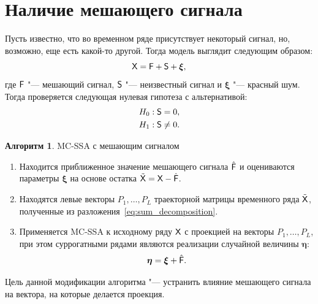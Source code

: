\documentclass[specialist,
substylefile = spbu_report.rtx,
subf,href,colorlinks=true, 12pt]{disser}
\theoremstyle{definition}
\newtheorem{algorithm}{Алгоритм}
\newcommand{\bfxi}{\boldsymbol{\xi}}
\begin{document}
\section{Наличие мешающего сигнала}\label{sect:nuisance}
Пусть известно, что во временном ряде присутствует некоторый сигнал, но, возможно, еще есть какой-то другой. Тогда модель выглядит следующим образом:
\[
\tX=\tF + \tS + \bfxi,
\]
где $\mathsf{F}$ "--- мешающий сигнал, $\mathsf{S}$ "--- неизвестный сигнал и $\bfxi$ "--- красный шум.
Тогда проверяется следующая нулевая гипотеза с альтернативой:
\begin{align*}
&H_0: \mathsf{S}=0,\\
&H_1: \mathsf{S} \ne 0.
\end{align*}
\begin{algorithm}{MC-SSA с мешающим сигналом}\label{alg:mc-ssa_nuisance}
\begin{enumerate}
	\item Находится приближенное значение мешающего сигнала $\hat{\mathsf{F}}$ и оцениваются параметры $\bfxi$ на основе остатка $\tilde{\mathsf{X}}=\mathsf{X}-\hat{\mathsf{F}}$.
	\item Находятся левые векторы $P_1,\ldots,P_L$ траекторной матрицы временного ряда $\tilde{\mathsf{X}}$, полученные из разложения~\eqref{eq:sum_decomposition}.
	\item Применяется MC-SSA к исходному ряду $\mathsf{X}$ с проекцией на векторы $P_1,\ldots,P_L$, при этом суррогатными рядами являются реализации случайной величины $\boldsymbol{\eta}$:
	\[
	\boldsymbol{\eta} = \bfxi + \hat\tF.
	\]
\end{enumerate}
\end{algorithm}
Цель данной модификации алгоритма "--- устранить влияние мешающего сигнала на вектора, на которые делается проекция.
\end{document}
